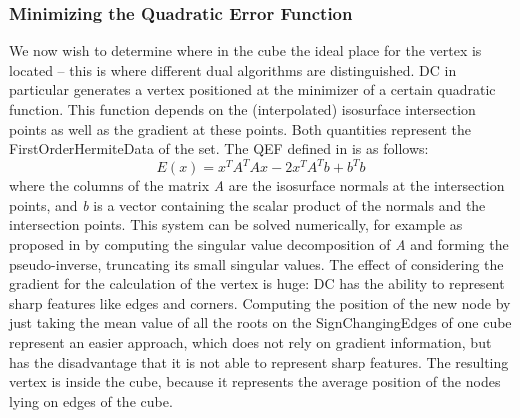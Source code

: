 \subsubsection{Minimizing the Quadratic Error Function}
We now wish to determine where in the cube the ideal place for the vertex is located -- this is where different dual algorithms are distinguished. \Ac{DC} in particular generates a vertex positioned at the minimizer of a certain quadratic function. This function depends on the (interpolated) isosurface intersection points as well as the gradient at these points. Both quantities represent the \acs{FirstOrderHermiteData} of the set.
The \acl{QEF} defined in \cite{Hermite2002} is as follows:
\begin{equation}
\label{eq:QEF}
E(x)= x^TA^TAx-2x^TA^Tb+b^Tb
\end{equation}
where the columns of the matrix \textit{A} are the  isosurface normals at the intersection points, and \textit{b} is a vector containing the scalar product of the normals and the intersection points. This system can be solved numerically, for example as proposed in \cite{Hermite2002} by computing the singular value decomposition of \textit{A} and forming the pseudo-inverse, truncating its small singular values. 
The effect of considering the gradient for the calculation of the vertex is huge: \ac{DC} has the ability to represent sharp features like edges and corners.
Computing the position of the new node by just taking the mean value of all the roots on the \acsp{SignChangingEdge} of one cube represent an easier approach, which does not rely on gradient information, but has the disadvantage that it is not able to represent sharp features. The resulting vertex is inside the cube, because it represents the average position of the nodes lying on edges of the cube.

